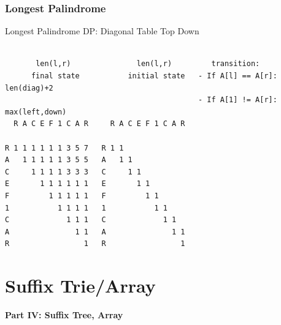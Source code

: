 \begin{frame}[fragile]
  \frametitle{Longest Palindrome}

  Longest Palindrome DP: Diagonal Table Top Down

  {\smaller
\begin{verbatim}

       len(l,r)               len(l,r)         transition:
      final state           initial state   - If A[l] == A[r]: len(diag)+2
                                            - If A[1] != A[r]: max(left,down)
  R A C E F 1 C A R     R A C E F 1 C A R

R 1 1 1 1 1 1 3 5 7   R 1 1
A   1 1 1 1 1 3 5 5   A   1 1
C     1 1 1 1 3 3 3   C     1 1
E       1 1 1 1 1 1   E       1 1
F         1 1 1 1 1   F         1 1
1           1 1 1 1   1           1 1
C             1 1 1   C             1 1
A               1 1   A               1 1
R                 1   R                 1

\end{verbatim}

  }
\end{frame}


\section{Suffix Trie/Array} %

\begin{frame}
  \begin{center}
    {\bf Part IV: Suffix Tree, Array}
  \end{center}
\end{frame}


